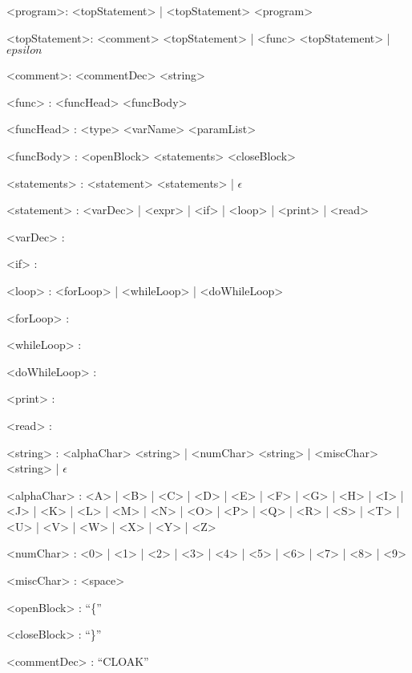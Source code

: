 \begingrammar
<program>: <topStatement> | <topStatement> <program>

<topStatement>: <comment> <topStatement> | <func> <topStatement> | $epsilon$

<comment>: <commentDec> <string>

<func> : <funcHead> <funcBody>

<funcHead> : <type> <varName> <paramList>

<funcBody> : <openBlock> <statements> <closeBlock>

<statements> : <statement> <statements> | $\epsilon$

<statement> : <varDec> | <expr> | <if> | <loop> | <print> | <read>

<varDec> :

<if> : 

<loop> : <forLoop> | <whileLoop> | <doWhileLoop>

<forLoop> : 

<whileLoop> : 

<doWhileLoop> : 

<print> : 

<read> : 

<string> : <alphaChar> <string> | <numChar> <string> |
           <miscChar> <string> | $\epsilon$

<alphaChar> : <A> | <B> | <C> | <D> | <E> | <F> | 
              <G> | <H> | <I> | <J> | <K> | <L> |
              <M> | <N> | <O> | <P> | <Q> | <R> |
              <S> | <T> | <U> | <V> | <W> | <X> |
              <Y> | <Z>

<numChar> : <0> | <1> | <2> | <3> | <4> | <5> | <6> | <7> | <8> | <9>

<miscChar> : <space>

<openBlock> : ``\{''

<closeBlock> : ``\}''

<commentDec> : ``CLOAK''

\endgrammar
